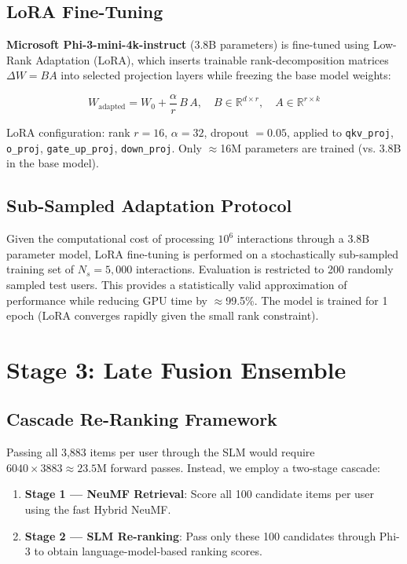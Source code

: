 \documentclass[11pt,a4paper]{article}
\begin{document}
\subsection{LoRA Fine-Tuning}
\textbf{Microsoft Phi-3-mini-4k-instruct} (3.8B parameters) is fine-tuned using Low-Rank Adaptation (LoRA), which inserts trainable rank-decomposition matrices $\Delta W = BA$ into selected projection layers while freezing the base model weights:

\begin{equation}
  W_{\text{adapted}} = W_0 + \frac{\alpha}{r}\,B\,A, \quad B \in \mathbb{R}^{d \times r}, \quad A \in \mathbb{R}^{r \times k}
\end{equation}

LoRA configuration: rank $r=16$, $\alpha=32$, dropout $=0.05$, applied to \texttt{qkv\_proj}, \texttt{o\_proj}, \texttt{gate\_up\_proj}, \texttt{down\_proj}. Only $\approx$16M parameters are trained (vs. 3.8B in the base model).

\subsection{Sub-Sampled Adaptation Protocol}
Given the computational cost of processing $10^6$ interactions through a 3.8B parameter model, LoRA fine-tuning is performed on a stochastically sub-sampled training set of $N_s = 5{,}000$ interactions. Evaluation is restricted to 200 randomly sampled test users. This provides a statistically valid approximation of performance while reducing GPU time by $\approx$99.5\%. The model is trained for 1 epoch (LoRA converges rapidly given the small rank constraint).

\section{Stage 3: Late Fusion Ensemble}

\subsection{Cascade Re-Ranking Framework}
Passing all 3,883 items per user through the SLM would require $6040 \times 3883 \approx 23.5\text{M}$ forward passes. Instead, we employ a two-stage cascade:

\begin{enumerate}[leftmargin=1.5em]
  \item \textbf{Stage 1 — NeuMF Retrieval}: Score all 100 candidate items per user using the fast Hybrid NeuMF.
  \item \textbf{Stage 2 — SLM Re-ranking}: Pass only these 100 candidates through Phi-3 to obtain language-model-based ranking scores.
\end{enumerate}
\end{document}

